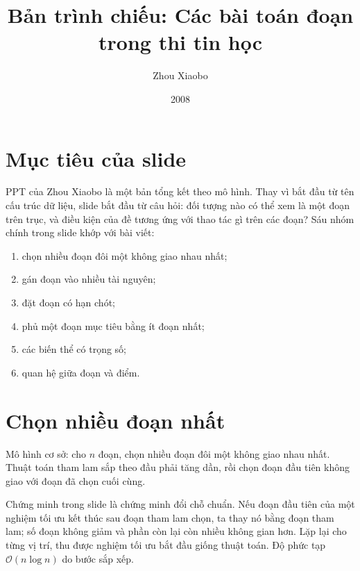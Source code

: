 \documentclass[11pt]{article}
\title{Bản trình chiếu: Các bài toán đoạn trong thi tin học}
\author{Zhou Xiaobo}
\date{2008}
\newcommand{\Oh}{\mathcal{O}}
\begin{document}
\maketitle


\section{Mục tiêu của slide}

PPT của Zhou Xiaobo là một bản tổng kết theo mô hình. Thay vì bắt đầu từ tên
cấu trúc dữ liệu, slide bắt đầu từ câu hỏi: đối tượng nào có thể xem là một
đoạn trên trục, và điều kiện của đề tương ứng với thao tác gì trên các đoạn?
Sáu nhóm chính trong slide khớp với bài viết:
\begin{enumerate}
  \item chọn nhiều đoạn đôi một không giao nhau nhất;
  \item gán đoạn vào nhiều tài nguyên;
  \item đặt đoạn có hạn chót;
  \item phủ một đoạn mục tiêu bằng ít đoạn nhất;
  \item các biến thể có trọng số;
  \item quan hệ giữa đoạn và điểm.
\end{enumerate}

\section{Chọn nhiều đoạn nhất}

Mô hình cơ sở: cho \(n\) đoạn, chọn nhiều đoạn đôi một không giao nhau nhất.
Thuật toán tham lam sắp theo đầu phải tăng dần, rồi chọn đoạn đầu tiên không
giao với đoạn đã chọn cuối cùng.

\begin{center}
\end{center}

Chứng minh trong slide là chứng minh đổi chỗ chuẩn. Nếu đoạn đầu tiên của một
nghiệm tối ưu kết thúc sau đoạn tham lam chọn, ta thay nó bằng đoạn tham lam;
số đoạn không giảm và phần còn lại còn nhiều không gian hơn. Lặp lại cho từng
vị trí, thu được nghiệm tối ưu bắt đầu giống thuật toán. Độ phức tạp
\(\Oh(n\log n)\) do bước sắp xếp.
\end{document}
